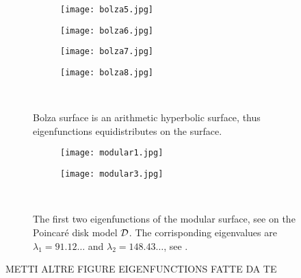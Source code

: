 \begin{figure}[H]
\centering
  \begin{subfigure}[b]{0.2\textwidth}
  \centering
    \texttt{[image: bolza5.jpg]}
    \label{fig:eig_bolza4}
  \end{subfigure}
  \begin{subfigure}[b]{0.2\textwidth}
  \centering
    \texttt{[image: bolza6.jpg]}
    \label{fig:eig_bolza5}
  \end{subfigure}
  \begin{subfigure}[b]{0.2\textwidth}
  \centering
    \texttt{[image: bolza7.jpg]}
    \label{fig:eig_bolza6}
  \end{subfigure}
    \begin{subfigure}[b]{0.2\textwidth}
  \centering
    \texttt{[image: bolza8.jpg]}
    \label{fig:eig_bolza7}
  \end{subfigure}
  \noindent\\
  \decoRule
  \caption{Bolza surface is an arithmetic hyperbolic surface, thus eigenfunctions equidistributes on the surface.}
  \label{fig:bolza_eig_equidistr}
\end{figure}



\begin{figure}[H]
\centering
  \begin{subfigure}[b]{0.4\textwidth}
  \centering
    \texttt{[image: modular1.jpg]}
    \label{fig:modular_eig1}
  \end{subfigure}
  \begin{subfigure}[b]{0.4\textwidth}
  \centering
    \texttt{[image: modular3.jpg]}
    \label{fig:modular_eig2}
  \end{subfigure}
  \noindent\\
  \decoRule
  \caption{The first two eigenfunctions of the modular surface, see on the Poincaré disk model $\mathcal{D}$. The corrisponding eigenvalues are $\lambda_{1}=91.12\ldots$ and $\lambda_{2}=148.43\ldots$, see \cite{Sarnak:review}.}
  \label{fig:first_two_eig_modular}
\end{figure}



METTI  ALTRE FIGURE EIGENFUNCTIONS FATTE DA TE 


